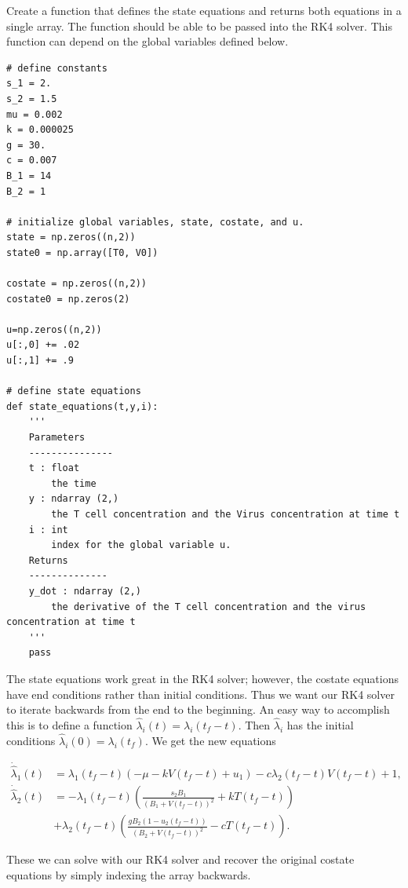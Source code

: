 \begin{problem}
Create a function that defines the state equations and returns both equations in a single array. The function should be able to be passed into the RK4 solver. This function can depend on the global variables defined below.

\begin{lstlisting}
# define constants
s_1 = 2.
s_2 = 1.5
mu = 0.002
k = 0.000025
g = 30.
c = 0.007
B_1 = 14
B_2 = 1

# initialize global variables, state, costate, and u.
state = np.zeros((n,2))
state0 = np.array([T0, V0])
	
costate = np.zeros((n,2))
costate0 = np.zeros(2)

u=np.zeros((n,2))
u[:,0] += .02
u[:,1] += .9

# define state equations
def state_equations(t,y,i):
	'''
	Parameters
	---------------
	t : float
		the time
	y : ndarray (2,)
		the T cell concentration and the Virus concentration at time t
	i : int
		index for the global variable u.
	Returns
	--------------
	y_dot : ndarray (2,)
		the derivative of the T cell concentration and the virus concentration at time t
	'''
	pass
\end{lstlisting}
\label{problem:hiv:state}
\end{problem}


The state equations work great in the RK4 solver; however, the costate equations have end conditions rather than initial conditions. Thus we want our RK4 solver to iterate backwards from the end to the beginning. An easy way to accomplish this is to define a function $ \hat{\lambda}_i(t)=\lambda_i(t_f - t).$ Then $\hat{\lambda}_i$ has the initial conditions $\hat{\lambda}_i(0) = \lambda_i(t_f)$. We get the new equations

\begin{align*}
\dot{\hat{\lambda}}_1(t) &=\lambda_1(t_f-t)\left(-\mu - kV(t_f-t) + u_{1}\right) - c\lambda_2(t_f-t)V(t_f-t) + 1, \\
\dot{\hat{\lambda}}_2(t) &= -\lambda_1(t_f-t)\left(\frac{s_2B_1}{(B_1+V(t_f-t))^2}+kT(t_f-t)\right) \\
&+ \lambda_2(t_f-t)\left(\frac{gB_2(1-u_2(t_f-t))}{(B_2 + V(t_f-t))^2} - cT(t_f-t)\right).
\end{align*}

These we can solve with our RK4 solver and recover the original costate equations by simply indexing the array backwards.

